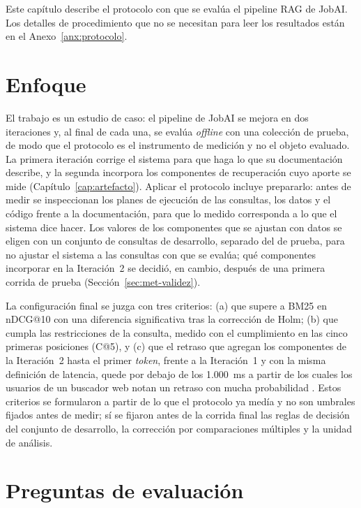 Este capítulo describe el protocolo con que se evalúa el pipeline RAG de JobAI. Los detalles de procedimiento que no se necesitan para leer los resultados están en el Anexo~\ref{anx:protocolo}.

\section{Enfoque}
\label{sec:met-enfoque}

El trabajo es un estudio de caso: el pipeline de JobAI se mejora en dos iteraciones y, al final de cada una, se evalúa \textit{offline} con una colección de prueba, de modo que el protocolo es el instrumento de medición y no el objeto evaluado. La primera iteración corrige el sistema para que haga lo que su documentación describe, y la segunda incorpora los componentes de recuperación cuyo aporte se mide (Capítulo~\ref{cap:artefacto}). Aplicar el protocolo incluye prepararlo: antes de medir se inspeccionan los planes de ejecución de las consultas, los datos y el código frente a la documentación, para que lo medido corresponda a lo que el sistema dice hacer. Los valores de los componentes que se ajustan con datos se eligen con un conjunto de consultas de desarrollo, separado del de prueba, para no ajustar el sistema a las consultas con que se evalúa; qué componentes incorporar en la Iteración~2 se decidió, en cambio, después de una primera corrida de prueba (Sección~\ref{sec:met-validez}).

La configuración final se juzga con tres criterios: (a) que supere a BM25 en nDCG@10 con una diferencia significativa tras la corrección de Holm; (b) que cumpla las restricciones de la consulta, medido con el cumplimiento en las cinco primeras posiciones (C@5), y (c) que el retraso que agregan los componentes de la Iteración~2 hasta el primer \textit{token}, frente a la Iteración~1 y con la misma definición de latencia, quede por debajo de los 1.000~ms a partir de los cuales los usuarios de un buscador web notan un retraso con mucha probabilidad \citep{Arapakis2014,Bai2017}. Estos criterios se formularon a partir de lo que el protocolo ya medía y no son umbrales fijados antes de medir; sí se fijaron antes de la corrida final las reglas de decisión del conjunto de desarrollo, la corrección por comparaciones múltiples y la unidad de análisis.

\section{Preguntas de evaluación}
\label{sec:met-preguntas}

